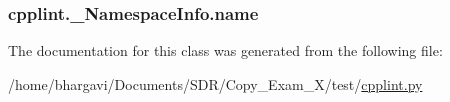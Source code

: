 \subsubsection[{\texorpdfstring{name}{name}}]{\setlength{\rightskip}{0pt plus 5cm}cpplint.\+\_\+\+Namespace\+Info.\+name}\hypertarget{classcpplint_1_1___namespace_info_a6b518dae822e4e440405654e83dc86a1}{}\label{classcpplint_1_1___namespace_info_a6b518dae822e4e440405654e83dc86a1}


The documentation for this class was generated from the following file\+:\begin{DoxyCompactItemize}
\item 
/home/bhargavi/\+Documents/\+S\+D\+R/\+Copy\+\_\+\+Exam\+\_\+X/test/\hyperlink{cpplint_8py}{cpplint.\+py}\end{DoxyCompactItemize}
